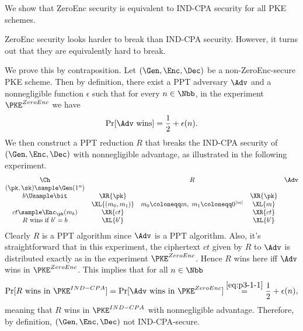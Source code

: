 \begin{answer}[i]
    We show that ZeroEnc security is equivalent to IND-CPA security for all PKE schemes.
    \begin{note}
        ZeroEnc security looks harder to break than IND-CPA security. However, it turns out that they are equivalently hard to break.
    \end{note}
    We prove this by contraposition. Let $(\Gen, \Enc, \Dec)$ be a non-ZeroEnc-secure PKE scheme. Then by definition, there exist a PPT adversary $\Adv$ and a nonnegligible function $\epsilon$ such that for every $n\in\Nbb$, in the experiment $\PKE^{ZeroEnc}$ we have
    \begin{equation}\label{eq:p3-1-1}
        \Pr[\Adv \textrm{ wins}] =\frac{1}{2}+\epsilon(n).
    \end{equation}
    We then construct a PPT reduction $R$ that breaks the IND-CPA security of $(\Gen, \Enc, \Dec)$ with nonnegligible advantage, as illustrated in the following experiment.
    {
        \[
            \begin{array}{@{} c c c c c@{}}
            \Ch & & R & & \Adv \\
            (\pk, \sk)\sample \Gen(1^n) & &  & & \\
            b\Usample\bit & \XR{\pk} & & \XR{\pk} &\\
            & \XL{(m_0, m_1)} & m_0\coloneqq m, \; m_1\coloneqq  0^{|m|} & \XL{m} & \\
            ct\sample \Enc_{\pk}(m_b)  & \XR{ct}& & \XR{ct} &\\
            \text{$R$ wins if $b' = b$} & \XL{b'} & & \XL{b'} & \\
            \end{array}
        \]
        \label{fig:p3-game1}
    }
    Clearly $R$ is a PPT algorithm since $\Adv$ is a PPT algorithm. Also, it's straightforward that in this experiment, the ciphertext $ct$ given by $R$ to $\Adv$ is distributed exactly as in the experiment $\PKE^{ZeroEnc}$. Hence $R$ wins here iff $\Adv$ wins in $\PKE^{ZeroEnc}$. This implies that for all $n\in\Nbb$
    \[
        \Pr[R \textrm{ wins in } \PKE^{IND-CPA}] =  \Pr[\Adv \textrm{ wins in } \PKE^{ZeroEnc}] 
        \stackrel{\eqref{eq:p3-1-1}}= \frac{1}{2}+\epsilon(n),
    \]
    meaning that $R$ wins in $\PKE^{IND-CPA}$ with nonnegligible advantage. Therefore, by definition, $(\Gen, \Enc, \Dec)$ not IND-CPA-secure. 





\end{answer}
